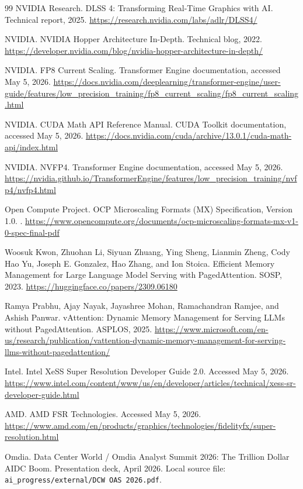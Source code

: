 \documentclass[11pt]{article}
\begin{document}
\begin{thebibliography}{99}
NVIDIA Research.
\newblock DLSS 4: Transforming Real-Time Graphics with AI.
\newblock Technical report, 2025.
\newblock \url{https://research.nvidia.com/labs/adlr/DLSS4/}

NVIDIA.
\newblock NVIDIA Hopper Architecture In-Depth.
\newblock Technical blog, 2022.
\newblock \url{https://developer.nvidia.com/blog/nvidia-hopper-architecture-in-depth/}

NVIDIA.
\newblock FP8 Current Scaling.
\newblock Transformer Engine documentation, accessed May 5, 2026.
\newblock \url{https://docs.nvidia.com/deeplearning/transformer-engine/user-guide/features/low_precision_training/fp8_current_scaling/fp8_current_scaling.html}

NVIDIA.
\newblock CUDA Math API Reference Manual.
\newblock CUDA Toolkit documentation, accessed May 5, 2026.
\newblock \url{https://docs.nvidia.com/cuda/archive/13.0.1/cuda-math-api/index.html}

NVIDIA.
\newblock NVFP4.
\newblock Transformer Engine documentation, accessed May 5, 2026.
\newblock \url{https://nvidia.github.io/TransformerEngine/features/low_precision_training/nvfp4/nvfp4.html}

Open Compute Project.
\newblock OCP Microscaling Formats (MX) Specification, Version 1.0.
.
\newblock \url{https://www.opencompute.org/documents/ocp-microscaling-formats-mx-v1-0-spec-final-pdf}

Woosuk Kwon, Zhuohan Li, Siyuan Zhuang, Ying Sheng, Lianmin Zheng,
Cody Hao Yu, Joseph E. Gonzalez, Hao Zhang, and Ion Stoica.
\newblock Efficient Memory Management for Large Language Model Serving with
PagedAttention.
\newblock SOSP, 2023.
\newblock \url{https://huggingface.co/papers/2309.06180}

Ramya Prabhu, Ajay Nayak, Jayashree Mohan, Ramachandran Ramjee, and
Ashish Panwar.
\newblock vAttention: Dynamic Memory Management for Serving LLMs without
PagedAttention.
\newblock ASPLOS, 2025.
\newblock \url{https://www.microsoft.com/en-us/research/publication/vattention-dynamic-memory-management-for-serving-llms-without-pagedattention/}

Intel.
\newblock Intel XeSS Super Resolution Developer Guide 2.0.
\newblock Accessed May 5, 2026.
\newblock \url{https://www.intel.com/content/www/us/en/developer/articles/technical/xess-sr-developer-guide.html}

AMD.
\newblock AMD FSR Technologies.
\newblock Accessed May 5, 2026.
\newblock \url{https://www.amd.com/en/products/graphics/technologies/fidelityfx/super-resolution.html}

Omdia.
\newblock Data Center World / Omdia Analyst Summit 2026: The Trillion Dollar
AIDC Boom.
\newblock Presentation deck, April 2026. Local source file:
\texttt{ai\_progress/external/DCW OAS 2026.pdf}.

\end{thebibliography}
\end{document}
